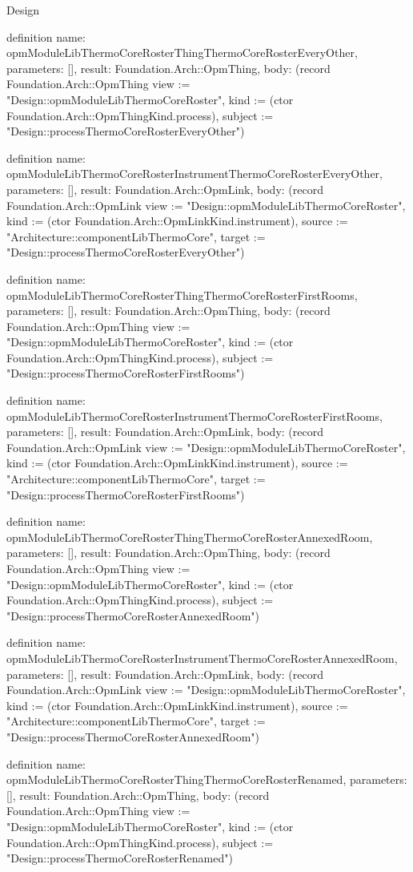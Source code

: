 \begin{lexlean}{Design}
\begin{semanticmodule}
definition{
  name: opmModuleLibThermoCoreRosterThingThermoCoreRosterEveryOther,
  parameters: [],
  result: Foundation.Arch::OpmThing,
  body: (record Foundation.Arch::OpmThing {view := "Design::opmModuleLibThermoCoreRoster", kind := (ctor Foundation.Arch::OpmThingKind.process), subject := "Design::processThermoCoreRosterEveryOther"})
}

definition{
  name: opmModuleLibThermoCoreRosterInstrumentThermoCoreRosterEveryOther,
  parameters: [],
  result: Foundation.Arch::OpmLink,
  body: (record Foundation.Arch::OpmLink {view := "Design::opmModuleLibThermoCoreRoster", kind := (ctor Foundation.Arch::OpmLinkKind.instrument), source := "Architecture::componentLibThermoCore", target := "Design::processThermoCoreRosterEveryOther"})
}

definition{
  name: opmModuleLibThermoCoreRosterThingThermoCoreRosterFirstRooms,
  parameters: [],
  result: Foundation.Arch::OpmThing,
  body: (record Foundation.Arch::OpmThing {view := "Design::opmModuleLibThermoCoreRoster", kind := (ctor Foundation.Arch::OpmThingKind.process), subject := "Design::processThermoCoreRosterFirstRooms"})
}

definition{
  name: opmModuleLibThermoCoreRosterInstrumentThermoCoreRosterFirstRooms,
  parameters: [],
  result: Foundation.Arch::OpmLink,
  body: (record Foundation.Arch::OpmLink {view := "Design::opmModuleLibThermoCoreRoster", kind := (ctor Foundation.Arch::OpmLinkKind.instrument), source := "Architecture::componentLibThermoCore", target := "Design::processThermoCoreRosterFirstRooms"})
}

definition{
  name: opmModuleLibThermoCoreRosterThingThermoCoreRosterAnnexedRoom,
  parameters: [],
  result: Foundation.Arch::OpmThing,
  body: (record Foundation.Arch::OpmThing {view := "Design::opmModuleLibThermoCoreRoster", kind := (ctor Foundation.Arch::OpmThingKind.process), subject := "Design::processThermoCoreRosterAnnexedRoom"})
}

definition{
  name: opmModuleLibThermoCoreRosterInstrumentThermoCoreRosterAnnexedRoom,
  parameters: [],
  result: Foundation.Arch::OpmLink,
  body: (record Foundation.Arch::OpmLink {view := "Design::opmModuleLibThermoCoreRoster", kind := (ctor Foundation.Arch::OpmLinkKind.instrument), source := "Architecture::componentLibThermoCore", target := "Design::processThermoCoreRosterAnnexedRoom"})
}

definition{
  name: opmModuleLibThermoCoreRosterThingThermoCoreRosterRenamed,
  parameters: [],
  result: Foundation.Arch::OpmThing,
  body: (record Foundation.Arch::OpmThing {view := "Design::opmModuleLibThermoCoreRoster", kind := (ctor Foundation.Arch::OpmThingKind.process), subject := "Design::processThermoCoreRosterRenamed"})
}


\end{semanticmodule}
\end{lexlean}
